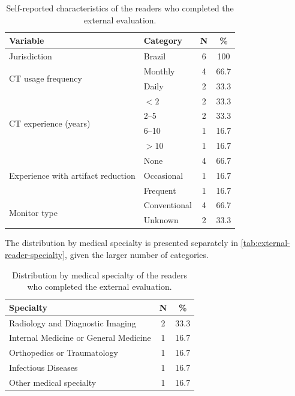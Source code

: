 \begin{table}[htbp]
\centering
\small
\begin{tabular}{llcc}
\toprule
\textbf{Variable} & \textbf{Category} & \textbf{N} & \textbf{\%} \\
\midrule
Jurisdiction & Brazil & 6 & 100 \\
\midrule
\multirow{2}{*}{CT usage frequency} & Monthly & 4 & 66.7 \\
                                          & Daily & 2 & 33.3 \\
\midrule
\multirow{4}{*}{CT experience (years)} & $<2$ & 2 & 33.3 \\
                                            & 2--5 & 2 & 33.3 \\
                                            & 6--10 & 1 & 16.7 \\
                                            & $>10$ & 1 & 16.7 \\
\midrule
\multirow{3}{*}{Experience with artifact reduction} & None & 4 & 66.7 \\
                                                         & Occasional & 1 & 16.7 \\
                                                         & Frequent & 1 & 16.7 \\
\midrule
\multirow{2}{*}{Monitor type} & Conventional & 4 & 66.7 \\
                                  & Unknown & 2 & 33.3 \\
\bottomrule
\end{tabular}
\captionsetup{skip=2pt}
\caption[Reader profile characteristics]{Self-reported characteristics of the readers who completed the external evaluation.}
\label{tab:external-reader-profile}
\end{table}
\FloatBarrier
The distribution by medical specialty is presented separately in \autoref{tab:external-reader-specialty}, given the larger number of categories.

\begin{table}[htbp]
\centering
\small
\begin{tabular}{lcc}
\toprule
\textbf{Specialty} & \textbf{N} & \textbf{\%} \\
\midrule
Radiology and Diagnostic Imaging & 2 & 33.3 \\
Internal Medicine or General Medicine & 1 & 16.7 \\
Orthopedics or Traumatology & 1 & 16.7 \\
Infectious Diseases & 1 & 16.7 \\
Other medical specialty & 1 & 16.7 \\
\bottomrule
\end{tabular}
\captionsetup{skip=2pt}
\caption[Reader specialty distribution]{Distribution by medical specialty of the readers who completed the external evaluation.}
\label{tab:external-reader-specialty}
\end{table}
\FloatBarrier


